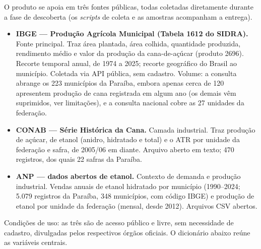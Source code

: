 \documentclass[11pt,a4paper]{article}
\begin{document}
O produto se apoia em três fontes públicas, todas coletadas diretamente durante a fase de
descoberta (os \textit{scripts} de coleta e as amostras acompanham a entrega).

\begin{itemize}
  \item \textbf{IBGE — Produção Agrícola Municipal (Tabela 1612 do SIDRA).} Fonte principal.
  Traz área plantada, área colhida, quantidade produzida, rendimento médio e valor da produção
  da cana-de-açúcar (produto 2696). Recorte temporal anual, de 1974 a 2025; recorte geográfico
  do Brasil ao município. Coletada via API pública, sem cadastro. Volume: a consulta abrange os
  223 municípios da Paraíba, embora apenas cerca de 120 apresentem produção de cana registrada
  em algum ano (os demais vêm suprimidos, ver limitações), e a consulta nacional cobre as 27
  unidades da federação.
  \item \textbf{CONAB — Série Histórica da Cana.} Camada industrial. Traz produção de açúcar,
  de etanol (anidro, hidratado e total) e o ATR por unidade da federação e safra, de 2005/06
  em diante. Arquivo aberto em texto; 470 registros, dos quais 22 safras da Paraíba.
  \item \textbf{ANP — dados abertos de etanol.} Contexto de demanda e produção industrial.
  Vendas anuais de etanol hidratado por município (1990–2024; 5.079 registros da Paraíba, 348
  municípios, com código IBGE) e produção de etanol por unidade da federação (mensal, desde
  2012). Arquivos CSV abertos.
\end{itemize}

Condições de uso: as três são de acesso público e livre, sem necessidade de cadastro,
divulgadas pelos respectivos órgãos oficiais. O dicionário abaixo reúne as variáveis centrais.
\end{document}
